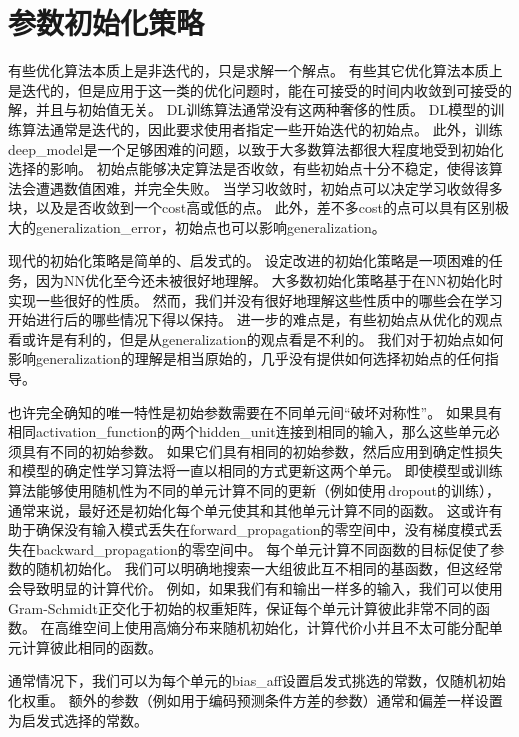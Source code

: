\section{参数初始化策略}
\label{sec:parameter_initialization_strategies}
有些优化算法本质上是非迭代的，只是求解一个解点。
有些其它优化算法本质上是迭代的，但是应用于这一类的优化问题时，能在可接受的时间内收敛到可接受的解，并且与初始值无关。
\gls{DL}训练算法通常没有这两种奢侈的性质。
\gls{DL}模型的训练算法通常是迭代的，因此要求使用者指定一些开始迭代的初始点。
此外，训练\gls{deep_model}是一个足够困难的问题，以致于大多数算法都很大程度地受到初始化选择的影响。
初始点能够决定算法是否收敛，有些初始点十分不稳定，使得该算法会遭遇数值困难，并完全失败。
当学习收敛时，初始点可以决定学习收敛得多块，以及是否收敛到一个\gls{cost}高或低的点。
此外，差不多\gls{cost}的点可以具有区别极大的\gls{generalization_error}，初始点也可以影响\gls{generalization}。


现代的初始化策略是简单的、启发式的。
设定改进的初始化策略是一项困难的任务，因为\gls{NN}优化至今还未被很好地理解。
大多数初始化策略基于在\gls{NN}初始化时实现一些很好的性质。
然而，我们并没有很好地理解这些性质中的哪些会在学习开始进行后的哪些情况下得以保持。
进一步的难点是，有些初始点从优化的观点看或许是有利的，但是从\gls{generalization}的观点看是不利的。
我们对于初始点如何影响\gls{generalization}的理解是相当原始的，几乎没有提供如何选择初始点的任何指导。


也许完全确知的唯一特性是初始参数需要在不同单元间``破坏对称性''。
如果具有相同\gls{activation_function}的两个\gls{hidden_unit}连接到相同的输入，那么这些单元必须具有不同的初始参数。
如果它们具有相同的初始参数，然后应用到确定性损失和模型的确定性学习算法将一直以相同的方式更新这两个单元。
即使模型或训练算法能够使用随机性为不同的单元计算不同的更新（例如使用\,\gls{dropout}的训练），通常来说，最好还是初始化每个单元使其和其他单元计算不同的函数。
这或许有助于确保没有输入模式丢失在\gls{forward_propagation}的零空间中，没有梯度模式丢失在\gls{backward_propagation}的零空间中。
每个单元计算不同函数的目标促使了参数的随机初始化。
我们可以明确地搜索一大组彼此互不相同的基函数，但这经常会导致明显的计算代价。  
例如，如果我们有和输出一样多的输入，我们可以使用Gram-Schmidt正交化于初始的权重矩阵，保证每个单元计算彼此非常不同的函数。
在高维空间上使用高熵分布来随机初始化，计算代价小并且不太可能分配单元计算彼此相同的函数。


通常情况下，我们可以为每个单元的\gls{bias_aff}设置启发式挑选的常数，仅随机初始化权重。
额外的参数（例如用于编码预测条件方差的参数）通常和偏差一样设置为启发式选择的常数。

